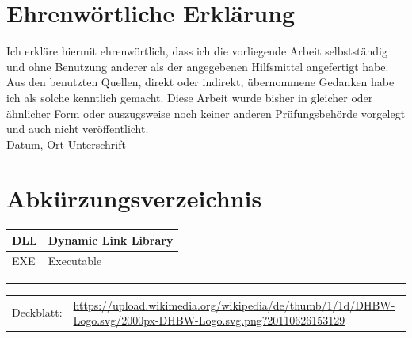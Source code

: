 \documentclass[12pt,a4paper]{article}
\begin{document}
\section*{Ehrenwörtliche Erklärung}
Ich erkläre hiermit ehrenwörtlich, dass ich die vorliegende Arbeit selbstständig und ohne Benutzung anderer als der angegebenen Hilfsmittel angefertigt habe. Aus den benutzten Quellen, direkt oder indirekt, übernommene Gedanken habe ich als solche kenntlich gemacht. Diese Arbeit wurde bisher in gleicher oder ähnlicher Form oder auszugsweise noch keiner anderen Prüfungsbehörde vorgelegt und auch nicht veröffentlicht.
\vspace{1cm}
\newline
\noindent {} \hfill {}\\
{\noindent \small Datum, Ort \hfill Unterschrift}

\newpage
\tableofcontents

\newpage
{}
\pagestyle{fancy}
\section*{Abkürzungsverzeichnis}
\begin{center}
	\renewcommand{\arraystretch}{1.5}
	\begin{tabularx}{.9\textwidth}{| l | X |}
		\hline
		DLL & Dynamic Link Library \\
		\hline
		EXE & Executable \\
		\hline
	\end{tabularx}
\end{center}

\newpage
\listoffigures
\vspace*{\fill}
\hrule
\begin{center}
	\small
	\begin{tabularx}{\textwidth}{l X}
		Deckblatt: & \url{https://upload.wikimedia.org/wikipedia/de/thumb/1/1d/DHBW-Logo.svg/2000px-DHBW-Logo.svg.png?20110626153129} \\
	\end{tabularx}
\end{center}
\end{document}
